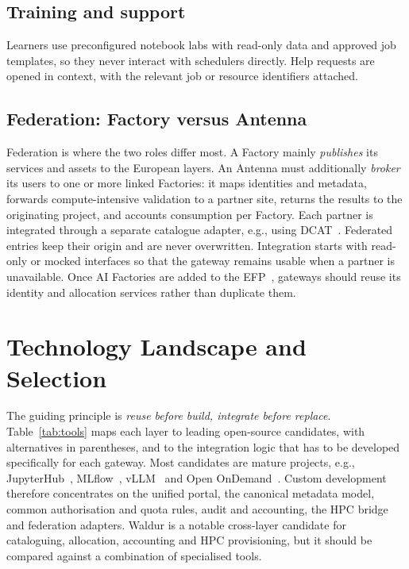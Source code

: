 \documentclass[conference,a4paper]{IEEEtran}
\begin{document}
\subsection{Training and support}
Learners use preconfigured notebook labs with read-only data and approved job templates, so they never interact with schedulers directly. Help requests are opened in context, with the relevant job or resource identifiers attached.

\subsection{Federation: Factory versus Antenna}
Federation is where the two roles differ most. A Factory mainly \emph{publishes} its services and assets to the European layers. An Antenna must additionally \emph{broker} its users to one or more linked Factories: it maps identities and metadata, forwards compute-intensive validation to a partner site, returns the results to the originating project, and accounts consumption per Factory. Each partner is integrated through a separate catalogue adapter, e.g., using DCAT~\cite{w3c_dcat3}. Federated entries keep their origin and are never overwritten. Integration starts with read-only or mocked interfaces so that the gateway remains usable when a partner is unavailable. Once AI Factories are added to the EFP~\cite{eurohpc_efp}, gateways should reuse its identity and allocation services rather than duplicate them.

\section{Technology Landscape and Selection}

The guiding principle is \emph{reuse before build, integrate before replace}. Table~\ref{tab:tools} maps each layer to leading open-source candidates, with alternatives in parentheses, and to the integration logic that has to be developed specifically for each gateway. Most candidates are mature projects, e.g., JupyterHub~\cite{kluyver2016jupyter}, MLflow~\cite{zaharia2018mlflow}, vLLM~\cite{kwon2023vllm} and Open OnDemand~\cite{hudak2018ood}. Custom development therefore concentrates on the unified portal, the canonical metadata model, common authorisation and quota rules, audit and accounting, the HPC bridge and federation adapters. Waldur is a notable cross-layer candidate for cataloguing, allocation, accounting and HPC provisioning, but it should be compared against a combination of specialised tools.
\end{document}
